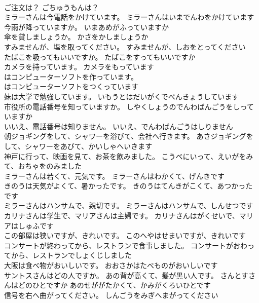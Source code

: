 \documentclass[8pt]{extreport}
\begin{document}
\begin{CJK}{UTF8}{min}
\\	ご注文は？	ごちゅうもんは？ 
\\	ミラーさんは今電話をかけています。	ミラーさんはいまでんわをかけています 
\\	今雨が降っていますか。	いまあめがふっていますか 
\\	傘を貸しましょうか。	かさをかしましょうか 
\\	すみませんが、塩を取ってください。	すみませんが、しおをとってください 
\\	たばこを吸ってもいいですか。	たばこをすってもいいですか 
\\	カメラを持っています。	カメラをもっています 
\\	はコンピューターソフトを作っています。	
\\	はコンピューターソフトをつくっています 
\\	妹は大学で勉強しています。	いもうとはだいがくでべんきょうしています 
\\	市役所の電話番号を知っていますか。	しやくしょうのでんわばんごうをしっていますか 
\\	いいえ、電話番号は知りません。	いいえ、でんわばんごうはしりません 
\\	朝ジョギングをして、シャワーを浴びて、会社へ行きます。	あさジョギングをして、シャワーをあびて、かいしゃへいきます 
\\	神戸に行って、映画を見て、お茶を飲みました。	こうべにいって、えいがをみて、おちゃをのみました 
\\	ミラーさんは若くて、元気です。	ミラーさんはわかくて、げんきです 
\\	きのうは天気がよくて、暑かったです。	きのうはてんきがこくて、あつかったです 
\\	ミラーさんはハンサムで、親切です。	ミラーさんはハンサムで、しんせつです 
\\	カリナさんは学生で、マリアさんは主婦です。	カリナさんはがくせいで、マリアはしゅふです 
\\	この部屋は狭いですが、きれいです。	このへやはせまいですが、きれいです 
\\	コンサートが終わってから、レストランで食事しました。	コンサートがおわってから、レストランでしょくじしました 
\\	大阪は食べ物がおいしいです。	おおさかはたべものがおいしいです 
\\	サントスさんはどの人ですか。 あの背が高くて、髪が黒い人です。	さんとすさんはどのひとですか あのせががたかくて、かみがくろいひとです 
\\	信号を右へ曲がってください。	しんごうをみぎへまがってください 

\end{CJK}
\end{document}
